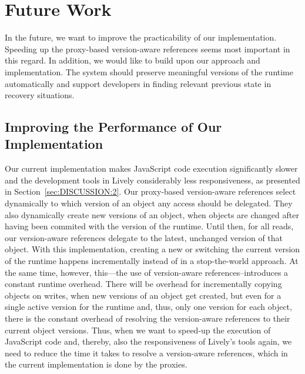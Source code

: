 

\chapter{Future Work} \label{chapter:FUTURE_WORK}

In the future, we want to improve the practicability of our implementation.
Speeding up the proxy-based version-aware references seems most important in this regard.
In addition, we would like to build upon our approach and implementation.
The system should preserve meaningful versions of the runtime automatically and support developers in finding relevant previous state in recovery situations.

\section{Improving the Performance of Our Implementation} \label{sec:FUTURE_WORK:1}

Our current implementation makes JavaScript code execution significantly slower and the development tools in Lively considerably less responsiveness, as presented in Section~\ref{sec:DISCUSSION:2}.
Our proxy-based version-aware references select dynamically to which version of an object any access should be delegated.
They also dynamically create new versions of an object, when objects are changed after having been commited with the version of the runtime.
Until then, for all reads, our version-aware references delegate to the latest, unchanged version of that object.
With this implementation, creating a new or switching the current version of the runtime happens incrementally instead of in a stop-the-world approach.
At the same time, however, this---the use of version-aware references--introduces a constant runtime overhead.
There will be overhead for incrementally copying objects on writes, when new versions of an object get created, but even for a single active version for the runtime and, thus, only one version for each object, there is the constant overhead of resolving the version-aware references to their current object versions.
Thus, when we want to speed-up the execution of JavaScript code and, thereby, also the responsiveness of Lively's tools again, we need to reduce the time it takes to resolve a version-aware references, which in the current implementation is done by the proxies.

